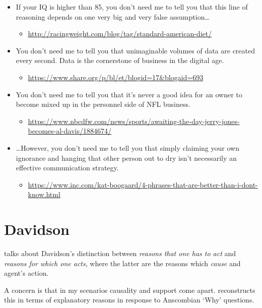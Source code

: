 \documentclass[10pt]{article}
\begin{document}
\begin{itemize}
\item If your IQ is higher than 85, you don’t need me to tell you that this line of reasoning depends on one very big and very false assumption\dots
  \begin{itemize}
  \item \url{http://racingweight.com/blog/tag/standard-american-diet/}
  \end{itemize}
\item You don’t need me to tell you that unimaginable volumes of data are created every second. Data is the cornerstone of business in the digital age.
  \begin{itemize}
  \item \url{https://www.share.org/p/bl/et/blogid=17&blogaid=693}
  \end{itemize}
\item You don’t need me to tell you that it’s never a good idea for an owner to become mixed up in the personnel side of NFL business.
  \begin{itemize}
  \item \url{https://www.nbcdfw.com/news/sports/awaiting-the-day-jerry-jones-becomes-al-davis/1884674/}
  \end{itemize}
\item \dots However, you don't need me to tell you that simply claiming your own ignorance and hanging that other person out to dry isn't necessarily an effective communication strategy.
  \begin{itemize}
  \item \url{https://www.inc.com/kat-boogaard/4-phrases-that-are-better-than-i-dont-know.html}
  \end{itemize}
\end{itemize}

\section{Davidson}
\label{sec:davidson}

\citeauthor{Neta:2019aa} talks about Davidson's distinction between \emph{reasons that one has to act} and \emph{reasons for which one acts}, where the latter are the reasons which \emph{cause} and agent's action.

A concern is that in my scenarios causality and support come apart.
\citeauthor{Neta:2019aa} reconstructs this in terms of explanatory reasons in response to Anscombian `Why' questions.
\end{document}

